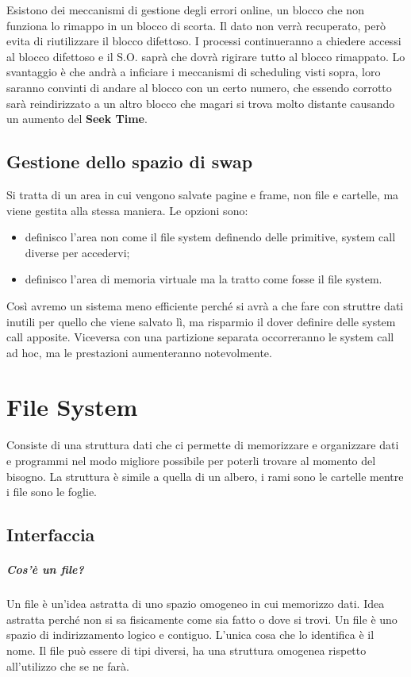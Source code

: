 \documentclass[a4paper, 12pt]{book}
\begin{document}
Esistono dei meccanismi di gestione degli errori online, 
un blocco che non funziona lo rimappo in un blocco di scorta.
Il dato non verrà recuperato, però evita di riutilizzare 
il blocco difettoso. I processi continueranno a chiedere 
accessi al blocco difettoso e il S.O. saprà che dovrà rigirare
tutto al blocco rimappato. Lo svantaggio è che andrà a inficiare 
i meccanismi di scheduling visti sopra, loro saranno convinti 
di andare al blocco con un certo numero, che essendo 
corrotto sarà reindirizzato a un altro blocco che magari si 
trova molto distante causando un aumento del \textbf{Seek Time}.

\section{Gestione dello spazio di swap}

Si tratta di un area in cui vengono salvate pagine e 
frame, non file e cartelle, ma viene gestita alla 
stessa maniera. Le opzioni sono:
\begin{itemize}
    \item definisco l'area non come il file system definendo delle primitive, system call diverse per accedervi;
    \item definisco l'area di memoria virtuale ma la tratto come fosse il file system.
\end{itemize}
Così avremo un sistema meno efficiente perché si avrà a 
che fare con struttre dati inutili per quello che viene 
salvato lì, ma risparmio il dover definire delle 
system call apposite. Viceversa con una partizione 
separata occorreranno le system call ad hoc, ma le 
prestazioni aumenteranno notevolmente.

\chapter{File System}

Consiste di una struttura dati che ci permette di memorizzare 
e organizzare dati e programmi nel modo migliore possibile 
per poterli trovare al momento del bisogno. La struttura 
è simile a quella di un albero, i rami sono le cartelle 
mentre i file sono le foglie.

\section{Interfaccia}

\paragraph{Cos'è un file?} Un file è un'idea astratta 
di uno spazio omogeneo in cui memorizzo dati. Idea 
astratta perché non si sa fisicamente come sia fatto 
o dove si trovi. Un file è uno spazio di indirizzamento 
logico e contiguo. L'unica cosa che lo identifica è 
il nome. Il file può essere di tipi diversi, ha una 
struttura omogenea rispetto all'utilizzo che se ne farà.
\end{document}
